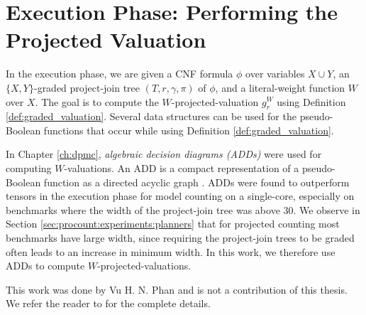 \section{Execution Phase: Performing the Projected Valuation}
\label{sec:procount:execution}

In the execution phase, we are given a CNF formula $\phi$ over variables $X \cup Y$, an $\{X, Y\}$-graded project-join tree $(T, r, \gamma, \pi)$ of $\phi$, and a literal-weight function $W$ over $X$.
The goal is to compute the $W$-projected-valuation $g^W_r$ using Definition \ref{def:graded_valuation}.
Several data structures can be used for the pseudo-Boolean functions that occur while using Definition \ref{def:graded_valuation}.

In Chapter \ref{ch:dpmc}, \emph{algebraic decision diagrams (ADDs)} were used for computing $W$-valuations.
An ADD is a compact representation of a pseudo-Boolean function as a directed acyclic graph \cite{bahar1997algebraic}.
ADDs were found to outperform tensors in the execution phase for model counting on a single-core, especially on benchmarks where the width of the project-join tree was above 30.
We observe in Section \ref{sec:procount:experiments:planners} that for projected counting most benchmarks have large width, since requiring the project-join trees to be graded often leads to an increase in minimum width.
In this work, we therefore use ADDs to compute $W$-projected-valuations.

This work was done by Vu H. N. Phan and is not a contribution of this thesis. We refer the reader to \cite{phan2021phd} for the complete details.
